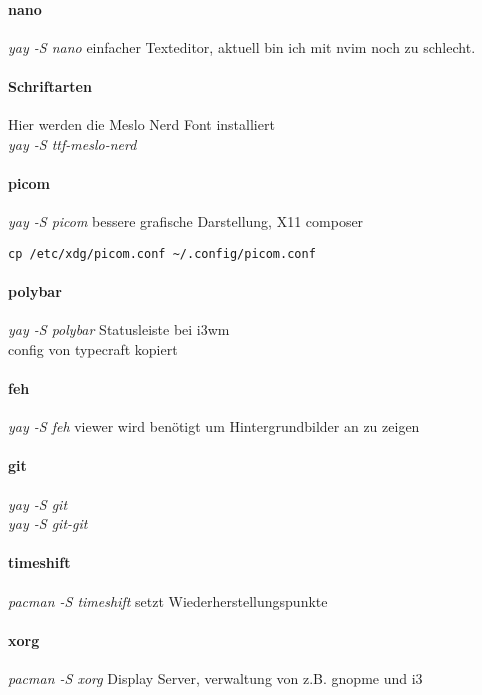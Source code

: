 \documentclass[10pt,a4paper,twoside]{book}
\begin{document}
\paragraph{nano}
\textit{yay -S nano} einfacher Texteditor, aktuell bin ich mit nvim noch zu schlecht.\\
\paragraph{Schriftarten}
Hier werden die Meslo Nerd Font installiert\\
\textit{yay -S ttf-meslo-nerd} \\
\paragraph{picom}
\textit{yay -S picom} bessere grafische Darstellung, X11 composer\\
\begin{verbatim}
cp /etc/xdg/picom.conf ~/.config/picom.conf
\end{verbatim}
\paragraph{polybar}
\textit{yay -S polybar} Statusleiste bei i3wm\\
config von typecraft kopiert\\
\paragraph{feh}
\textit{yay -S feh} viewer wird benötigt um Hintergrundbilder an zu zeigen\\
\paragraph{git}
\textit{yay -S git}\\
\textit{yay -S git-git}\\
\paragraph{timeshift}
\textit{pacman -S timeshift} setzt Wiederherstellungspunkte\\
\paragraph{xorg}
\textit{pacman -S xorg} Display Server, verwaltung von z.B. gnopme und i3\\
\end{document}

